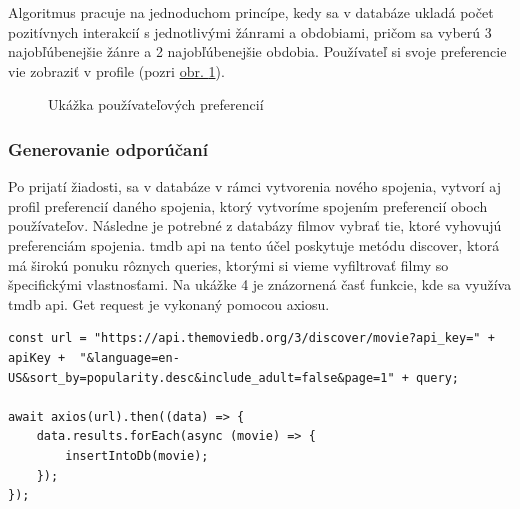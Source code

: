 Algoritmus pracuje na jednoduchom princípe, kedy sa v databáze ukladá počet pozitívnych interakcií s jednotlivými žánrami a obdobiami, pričom sa vyberú 3 najobľúbenejšie žánre a 2 najobľúbenejšie obdobia. Používateľ si svoje preferencie vie zobraziť v profile (pozri \hyperref[userprofile]{obr. \ref{userprofile}}).
\vspace{85mm}
\begin{figure}[hbt!]
  \centering   
  \def\stackalignment{c}
           \scriptsize
	\caption{Ukážka používateľových preferencií}  
  \label{userprofile}
\end{figure}

\subsubsection{Generovanie odporúčaní}
Po prijatí žiadosti, sa v databáze v rámci vytvorenia nového spojenia, vytvorí aj profil preferencií daného spojenia, ktorý vytvoríme spojením preferencií oboch používateľov. Následne je potrebné z databázy filmov vybrať tie, ktoré vyhovujú preferenciám spojenia. \acrshort{tmdb} \acrshort{api} na tento účel poskytuje metódu discover, ktorá má širokú ponuku rôznych queries, ktorými si vieme vyfiltrovať filmy so špecifickými vlastnosťami. Na ukážke 4 je znázornená časť funkcie, kde sa využíva \acrshort{tmdb} \acrshort{api}. Get request je vykonaný pomocou axiosu.

\begin{lstlisting}[caption={Get request na TMDb}, label={appjs-navDone}] 
const url = "https://api.themoviedb.org/3/discover/movie?api_key=" + apiKey +  "&language=en-US&sort_by=popularity.desc&include_adult=false&page=1" + query;

await axios(url).then((data) => {
    data.results.forEach(async (movie) => {
        insertIntoDb(movie);
    });
});

\end{lstlisting}
